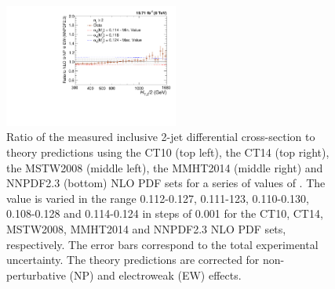 \begin{figure}[!htbp]
\begin{center}
 \vspace*{3mm}
 \includegraphics[width=0.51\textwidth]{Plots_HT_2_150/Sensitivity_2_ratio_NLO_NNPDF23_EW.pdf}
 \caption[Ratio of the measured inclusive 2-jet differential cross-section to theory predictions using different PDF sets.]{Ratio of the measured inclusive 2-jet differential cross-section to theory predictions using the CT10 (top left), the CT14 (top right), the MSTW2008 (middle left), the MMHT2014 (middle right) and NNPDF2.3 (bottom) NLO PDF sets for a series of values of \alpsmz. The \alpsmz value is varied in the range 0.112-0.127, 0.111-123, 0.110-0.130, 0.108-0.128 and 0.114-0.124 in steps of 0.001 for the CT10, CT14, MSTW2008, MMHT2014 and NNPDF2.3 NLO PDF sets, respectively. The error bars correspond to the total experimental uncertainty. The theory predictions are corrected for non-perturbative (NP) and electroweak (EW) effects.}
 \label{fig:sensitivity_2}
 \end{center}
\end{figure}


